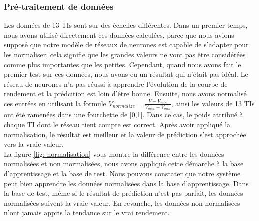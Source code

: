 \subsubsection{Pré-traitement de données}

Les données de 13 TIs sont sur des échelles différentes. Dans un premier temps, nous avons utilisé directement ces données calculées, parce que nous avions supposé que notre modèle de réseaux de neurones est capable de s'adapter pour les normaliser, cela signifie que les grandes valeurs ne vont pas être considérées comme plus importantes que les petites. Cependant, quand nous avons fait le premier test sur ces données, nous avons eu un résultat qui n’était pas idéal. Le réseau de neurones n'a pas réussi à apprendre l'évolution de la courbe de rendement et la prédcition est loin d'être bonne. Ensuite, nous avons normalisé ces entrées en utilisant la formule $ V_{normalize} = \frac{V-V_{min}}{V_{max}-V_{min}}$, ainsi les valeurs de 13 TIs ont été ramenées dans une fourchette de [0,1]. Dans ce cas, le poids attribué à chaque TI dont le réseau tient compte est correct. Après avoir appliqué la normalisation, le résultat est meilleur et la valeur de prédiction s'est approchée vers la vraie valeur. \\

La figure \ref{fig: normalisation} vous montre la différence entre les données normalisées et non mormalisées, nous avons appliqué cette démarche à la base d'apprentissage et la base de test. Nous pouvons constater que notre système peut bien apprendre les données normalisées dans la base d'apprentissage. Dans la base de test, même si le résultat de prédiction n'est pas parfait, les données normalisées suivent la vraie valeur. En revanche, les données non normalisées n'ont jamais appris la tendance sur le vrai rendement. 

